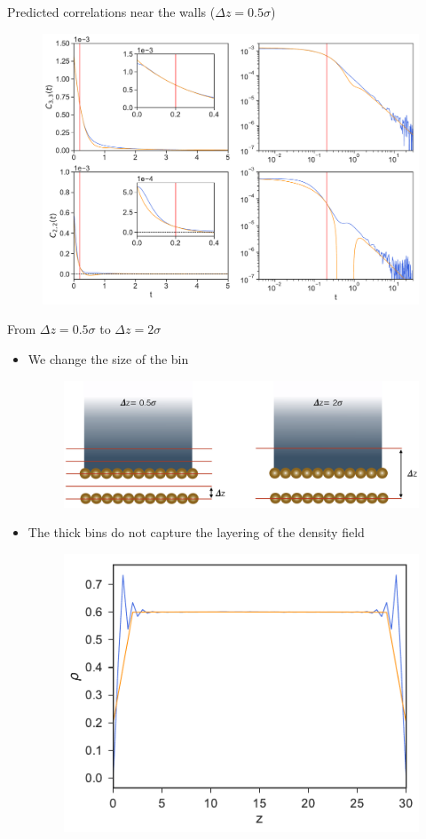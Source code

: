 \documentclass{beamer}
\begin{document}
\begin{frame}{Predicted correlations near the walls ($\Delta z=0.5\sigma$)}
\begin{figure}[h!]
\includegraphics[width=\linewidth]{Predictions-WALLS-66nodes-defense}
\end{figure}
\end{frame}

\begin{frame}{From $\Delta z=0.5\sigma$ to $\Delta z=2\sigma$}
  \begin{itemize}
    \item We change the size of the bin
\begin{figure}[h!]
\includegraphics[width=0.9\linewidth]{bin_size}
\end{figure}
\item The thick bins do not capture the layering of the density field
\begin{figure}[h!]
\includegraphics[width=0.47\linewidth]{DensityProfile-WALLS}
\end{figure}
  \end{itemize}
\end{frame}
\end{document}
